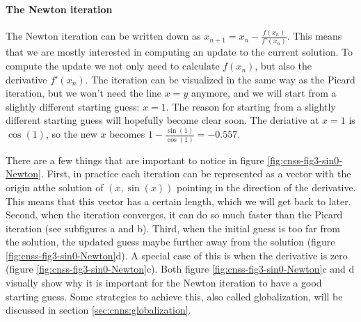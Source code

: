 \paragraph{The Newton iteration}

The Newton iteration can be written down as $x_{n+1} = x_n - \frac{f(x_n)}{f'(x_n)}$. This means  
that we are mostly interested in computing an update to the current solution. To compute the 
update we not only need to calculate $f(x_n)$, but also the derivative $f'(x_n)$. The iteration 
can be visualized in the same way as the Picard iteration, but we won't need the line $x=y$ 
anymore, and we will start from a slightly different starting guess: $x=1$. The reason for
starting from a slightly different starting guess will hopefully become clear soon. The 
deriative at $x=1$ is $\cos(1)$, so the new $x$ becomes $1-\frac{\sin(1)}{\cos(1)}=-0.557$. 

There are a few things that are important to notice in figure \ref{fig:cnss-fig3-sin0-Newton}. 
First, in practice each iteration can be represented as a vector with
the origin atthe solution of $(x,\sin(x))$ pointing in the direction of the derivative. This 
means that this vector has a certain length, which we will get back to later.
Second, when the iteration converges, it can do so much faster than the Picard 
iteration (see subfigures a and b). Third, when the initial guess
is too far from the solution, the updated guess maybe further away from the solution (figure 
\ref{fig:cnss-fig3-sin0-Newton}d). A special case of this is when the derivative is zero 
(figure \ref{fig:cnss-fig3-sin0-Newton}c). Both figure  \ref{fig:cnss-fig3-sin0-Newton}c and d
visually show why it is important for the Newton iteration to have a good starting guess. 
Some strategies to achieve this, also called globalization, will be discussed in section 
\ref{sec:cnns:globalization}.


